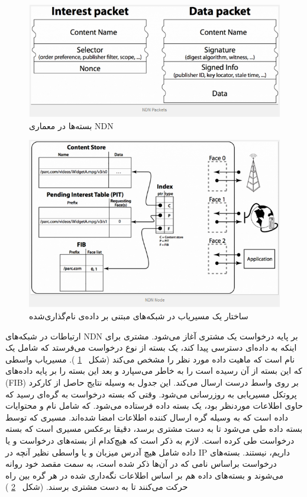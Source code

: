 \begin{figure}[H]
\centering
\includegraphics[scale=0.75]{./resources/figures/3_NDNpackets.png}
\caption{بسته‌ها در معماری NDN}
\label{fig:packets}
\end{figure}

\begin{figure}[H]
\centering
\includegraphics[scale=1]{./resources/figures/3_NDNnode.png}
\caption{ساختار یک مسیریاب در شبکه‌های مبتنی بر داده‌ی نام‌گذاری‌شده}
\label{fig:node}
\end{figure}



ارتباطات در شبکه‌های NDN بر پایه درخواست یک مشتری آغاز می‌شود. مشتری برای اینکه به داده‌ای دسترسی پیدا کند، یک بسته از نوع درخواست می‌فرستد که شامل یک نام است که ماهیت داده مورد نظر را مشخص می‌کند (شکل
‍‍‍‍~\ref{fig:packets}
). مسیریاب واسطی که این بسته از آن رسیده است را به خاطر می‌سپارد و بعد این بسته را بر پایه داده‌های  (FIB) بر روی واسط درست ارسال می‌کند. این جدول به وسیله نتایج حاصل از کارکرد پروتکل مسیریابی به روزرسانی می‌شود. وقتی که بسته درخواست به گره‌ای رسید که حاوی اطلاعات موردنظر بود، یک بسته داده فرستاده می‌شود. که شامل نام و محتوایات داده است که به وسیله گره ارسال کننده اطلاعات امضا شده‌اند. مسیری که توسط بسته داده طی می‌شود تا به دست مشتری برسد، دقیقا برعکس مسیری است که بسته درخواست طی کرده است. لازم به ذکر است که هیچ‌کدام از بسته‌‌های درخواست و یا داده شامل هیچ آدرس میزبان و یا واسطی نظیر آنچه در IP  داریم، نیستند. بسته‌های درخواست براساس نامی که در آن‌ها ذکر شده است، به سمت مقصد خود روانه می‌شوند و بسته‌های داده هم بر اساس اطلاعات نگه‌داری شده در هر گره بین راه حرکت می‌کنند تا به دست مشتری برسند. (‌شکل
~\ref{fig:node}
)

